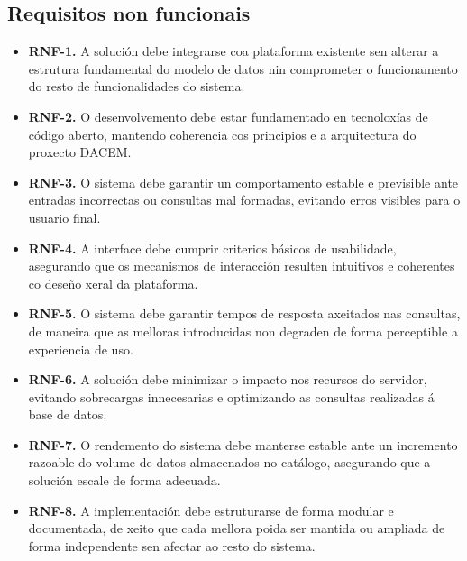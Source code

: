 \documentclass[%
    a4paper,               %
    twoside,               %
    10pt,                  %
]{article}                 %
\begin{document}
\subsection{Requisitos non funcionais}
\label{req:sec:rnf}
\begin{itemize}
    \item \label{req:rnf1}\textbf{RNF-1.} A solución debe integrarse coa plataforma existente sen alterar a estrutura fundamental do modelo de datos nin comprometer o funcionamento do resto de funcionalidades do sistema.

    \item \label{req:rnf2}\textbf{RNF-2.} O desenvolvemento debe estar fundamentado en tecnoloxías de código aberto, mantendo coherencia cos principios e a arquitectura do proxecto DACEM.

    \item \label{req:rnf3}\textbf{RNF-3.} O sistema debe garantir un comportamento estable e previsible ante entradas incorrectas ou consultas mal formadas, evitando erros visibles para o usuario final.

    \item \label{req:rnf4}\textbf{RNF-4.} A interface debe cumprir criterios básicos de usabilidade, asegurando que os mecanismos de interacción resulten intuitivos e coherentes co deseño xeral da plataforma.

    \item \label{req:rnf5}\textbf{RNF-5.} O sistema debe garantir tempos de resposta axeitados nas consultas, de maneira que as melloras introducidas non degraden de forma perceptible a experiencia de uso.

    \item \label{req:rnf6}\textbf{RNF-6.} A solución debe minimizar o impacto nos recursos do servidor, evitando sobrecargas innecesarias e optimizando as consultas realizadas á base de datos.

    \item \label{req:rnf7}\textbf{RNF-7.} O rendemento do sistema debe manterse estable ante un incremento razoable do volume de datos almacenados no catálogo, asegurando que a solución escale de forma adecuada.

    \item \label{req:rnf8}\textbf{RNF-8.} A implementación debe estruturarse de forma modular e documentada, de xeito que cada mellora poida ser mantida ou ampliada de forma independente sen afectar ao resto do sistema.
\end{itemize}
\end{document}
